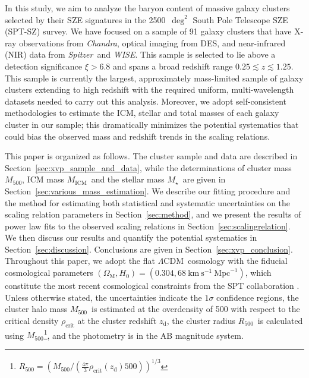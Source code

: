 \documentclass[useAMS,usenatbib,iop,numberedappendix]{mn2e}
\newcommand{\LCDM}{\ensuremath{\Lambda\textrm{CDM}}}
\newcommand{\OmegaM}{\ensuremath{\Omega_{\mathrm{M}}}}
\newcommand{\Hnow}{\ensuremath{H_{0}}}
\newcommand{\Rfiveoo}{\ensuremath{R_{500}}}
\newcommand{\Mfiveoo}{\ensuremath{M_{500}}}
\newcommand{\redshift}{\ensuremath{z}}
\newcommand{\CHANDRA}{\emph{Chandra}}
\newcommand{\Spitzer}{\emph{Spitzer}}
\newcommand{\WISE}{\emph{WISE}}
\newcommand{\zd}{\ensuremath{z_{\mathrm{d}}}}
\newcommand{\Mstar}{\ensuremath{M_{\star}}}
\newcommand{\Mgas}{\ensuremath{M_{\mathrm{ICM}}}}
\begin{document}
In this study, we aim to analyze the baryon content of massive galaxy clusters selected by their SZE signatures in the 2500~$\deg^2$ South Pole Telescope SZE (SPT-SZ) survey.  We have focused on a sample of 91 galaxy clusters that have X-ray observations from \CHANDRA, optical imaging from DES, and near-infrared (NIR) data from \Spitzer\ and \WISE.  This sample is selected to lie above a detection significance $\xi>6.8$ and spans a broad redshift range $0.25\lesssim\redshift\lesssim1.25$. 
This sample is currently the largest, approximately mass-limited sample of galaxy clusters extending to high redshift with the required uniform, multi-wavelength datasets needed to carry out this analysis.  Moreover, we adopt self-consistent methodologies to estimate the ICM, stellar and total masses of each galaxy cluster in our sample; this dramatically minimizes the potential systematics that could bias the observed mass and redshift trends in the scaling relations.


This paper is organized as follows. 
The cluster sample and data are described in Section~\ref{sec:xvp_sample_and_data}, while the determinations of cluster mass \Mfiveoo, ICM mass \Mgas\ and the stellar mass \Mstar\ are given in Section~\ref{sec:various_mass_estimation}.  
We describe our fitting procedure and the method for estimating both statistical and systematic uncertainties on the scaling relation parameters in Section~\ref{sec:method}, and we
present the results of power law fits to the observed scaling relations in Section~\ref{sec:scalingrelation}.
We then discuss our results and quantify the potential systematics in Section~\ref{sec:discussion}. 
Conclusions are given in Section~\ref{sec:xvp_conclusion}.
Throughout this paper, we adopt the flat \LCDM\ cosmology with the fiducial cosmological parameters $(\OmegaM, \Hnow) = (0.304, 68~\mathrm{km}~\mathrm{s}^{-1}~\mathrm{Mpc}^{-1})$, which constitute the most recent cosmological constraints from the SPT collaboration \citep{dehaan16}.    Unless otherwise stated, the uncertainties indicate the $1\sigma$ confidence regions, the cluster halo mass \Mfiveoo\ is estimated at the overdensity of 500 with respect to the critical density $\rho_{\mathrm{crit}}$ at the cluster redshift \zd, the cluster radius \Rfiveoo\ is calculated using \Mfiveoo\footnote{$\Rfiveoo = \left( \Mfiveoo / \left( \frac{4\pi}{3} \rho_{\mathrm{crit}}(\zd) 500\right) \right)^{1 / 3}$}, and the photometry is in the AB magnitude system.


%
%
\end{document}
